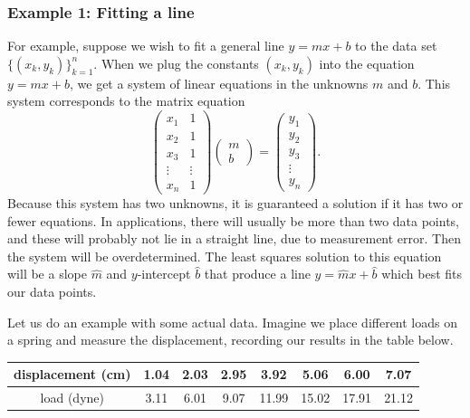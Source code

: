 \subsubsection*{Example 1: Fitting a line}
For example, suppose we wish to fit a general line $y=mx+b$ to the data set $\{(x_k, y_k)\}_{k=1}^n$. 
When we plug the constants $(x_k, y_k)$ into the equation $y=mx+b$, we get a system of linear equations in the unknowns $m$ and $b$. 
This system corresponds to the matrix equation
\[
\begin{pmatrix}
x_1 & 1\\
x_2 & 1\\
x_3 & 1\\
\vdots & \vdots\\
x_n & 1
\end{pmatrix}
\begin{pmatrix}
m\\
b
\end{pmatrix}=
\begin{pmatrix}
y_1\\
y_2\\
y_3\\
\vdots\\
y_n
\end{pmatrix}.
\]
Because this system has two unknowns, it is guaranteed a solution if it has two or fewer equations. 
In applications, there will usually be more than two data points, and these will probably not lie in a straight line, due to measurement error. 
Then the system will be overdetermined. 
The least squares solution to this equation will be a slope $\widehat{m}$ and $y$-intercept $\widehat{b}$ that produce a line $y = \widehat{m}x+\widehat{b}$ which best fits our data points.










Let us do an example with some actual data. Imagine we place different loads on a spring and measure the displacement, recording our results in the table below.
\begin{center}
\begin{tabular}{c|c|c|c|c|c|c|c}
displacement (cm)& 1.04  &2.03  &2.95  &3.92  &5.06  &6.00  &7.07  \\ \hline
load (dyne) & 3.11&  6.01&  9.07&  11.99 &  15.02&  17.91&  21.12\\
\end{tabular}
\end{center}

